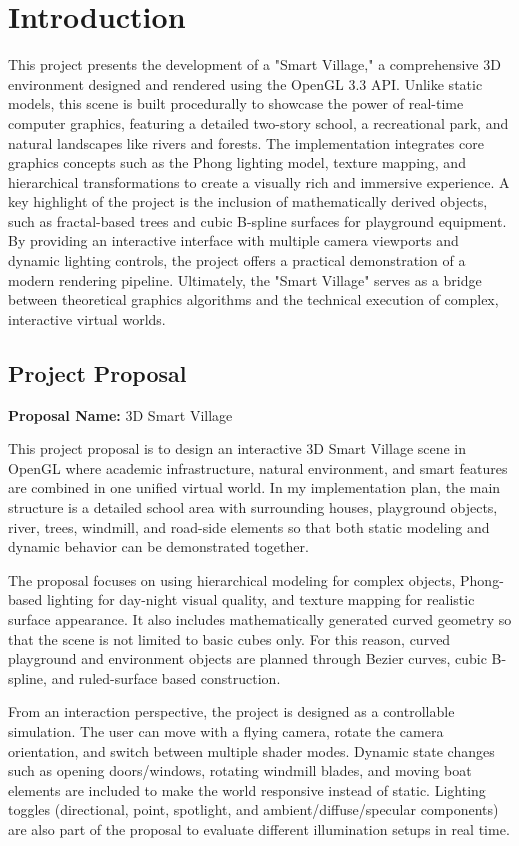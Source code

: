 \documentclass[12pt,a4paper]{report}
\begin{document}
\chapter{Introduction}
This project presents the development of a "Smart Village," a comprehensive 3D environment designed and rendered using the OpenGL 3.3 API. Unlike static models, this scene is built procedurally to showcase the power of real-time computer graphics, featuring a detailed two-story school, a recreational park, and natural landscapes like rivers and forests. The implementation integrates core graphics concepts such as the Phong lighting model, texture mapping, and hierarchical transformations to create a visually rich and immersive experience. A key highlight of the project is the inclusion of mathematically derived objects, such as fractal-based trees and cubic B-spline surfaces for playground equipment. By providing an interactive interface with multiple camera viewports and dynamic lighting controls, the project offers a practical demonstration of a modern rendering pipeline. Ultimately, the "Smart Village" serves as a bridge between theoretical graphics algorithms and the technical execution of complex, interactive virtual worlds.

\section{Project Proposal}
\textbf{Proposal Name:} 3D Smart Village

This project proposal is to design an interactive 3D Smart Village scene in OpenGL where academic infrastructure, natural environment, and smart features are combined in one unified virtual world. In my implementation plan, the main structure is a detailed school area with surrounding houses, playground objects, river, trees, windmill, and road-side elements so that both static modeling and dynamic behavior can be demonstrated together.

The proposal focuses on using hierarchical modeling for complex objects, Phong-based lighting for day-night visual quality, and texture mapping for realistic surface appearance. It also includes mathematically generated curved geometry so that the scene is not limited to basic cubes only. For this reason, curved playground and environment objects are planned through Bezier curves, cubic B-spline, and ruled-surface based construction.

From an interaction perspective, the project is designed as a controllable simulation. The user can move with a flying camera, rotate the camera orientation, and switch between multiple shader modes. Dynamic state changes such as opening doors/windows, rotating windmill blades, and moving boat elements are included to make the world responsive instead of static. Lighting toggles (directional, point, spotlight, and ambient/diffuse/specular components) are also part of the proposal to evaluate different illumination setups in real time.
\end{document}
